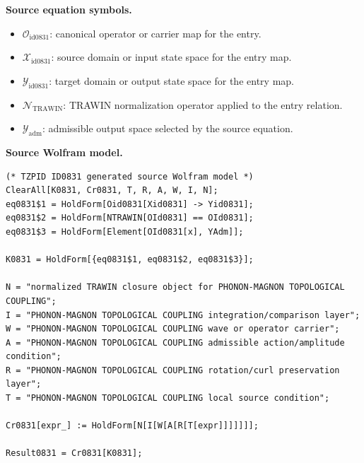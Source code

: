 \begin{minipage}[t]{0.49\linewidth}
\begingroup
\small
\raggedright
\textbf{Source equation symbols.}\par
\begin{itemize}[leftmargin=1.35em,itemsep=1pt,topsep=1pt,parsep=0pt]
    \item $\mathcal{O}_{\mathrm{id0831}}$: canonical operator or carrier map for the entry.
    \item $\mathcal{X}_{\mathrm{id0831}}$: source domain or input state space for the entry map.
    \item $\mathcal{Y}_{\mathrm{id0831}}$: target domain or output state space for the entry map.
    \item $\mathcal{N}_{\mathrm{TRAWIN}}$: TRAWIN normalization operator applied to the entry relation.
    \item $\mathcal{Y}_{\mathrm{adm}}$: admissible output space selected by the source equation.
\end{itemize}
\endgroup
\end{minipage}\hfill
\begin{minipage}[t]{0.47\linewidth}
\begingroup
\scriptsize
\raggedright
\textbf{Source Wolfram model.}\par
\begin{Verbatim}[fontsize=\tiny,breaklines=true,breakanywhere=true]
(* TZPID ID0831 generated source Wolfram model *)
ClearAll[K0831, Cr0831, T, R, A, W, I, N];
eq0831$1 = HoldForm[Oid0831[Xid0831] -> Yid0831];
eq0831$2 = HoldForm[NTRAWIN[OId0831] == OId0831];
eq0831$3 = HoldForm[Element[OId0831[x], YAdm]];

K0831 = HoldForm[{eq0831$1, eq0831$2, eq0831$3}];

N = "normalized TRAWIN closure object for PHONON-MAGNON TOPOLOGICAL COUPLING";
I = "PHONON-MAGNON TOPOLOGICAL COUPLING integration/comparison layer";
W = "PHONON-MAGNON TOPOLOGICAL COUPLING wave or operator carrier";
A = "PHONON-MAGNON TOPOLOGICAL COUPLING admissible action/amplitude condition";
R = "PHONON-MAGNON TOPOLOGICAL COUPLING rotation/curl preservation layer";
T = "PHONON-MAGNON TOPOLOGICAL COUPLING local source condition";

Cr0831[expr_] := HoldForm[N[I[W[A[R[T[expr]]]]]]];

Result0831 = Cr0831[K0831];
\end{Verbatim}
\endgroup
\end{minipage}

